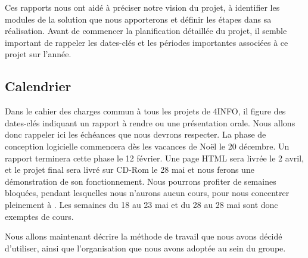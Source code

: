 	Ces rapports nous ont aidé à préciser notre vision du projet, à identifier les modules de la solution que nous apporterons et définir les étapes dans sa réalisation. Avant de commencer la planification détaillée du projet, il semble important de rappeler les dates-clés et les périodes importantes associées à ce projet sur l'année.

	\subsection{Calendrier}



	Dans le cahier des charges commun à tous les projets de 4INFO, il figure des dates-clés indiquant un rapport à rendre ou une présentation orale. Nous allons donc rappeler ici les échéances que nous devrons respecter. La phase de conception logicielle commencera dès les vacances de Noël le 20 décembre. Un rapport terminera cette phase le 12 février. Une page HTML sera livrée le 2 avril, et le projet final sera livré sur CD-Rom le 28 mai et nous ferons une démonstration de son fonctionnement.
	Nous pourrons profiter de semaines \og bloquées\fg{}, pendant lesquelles nous n'aurons aucun cours, pour nous concentrer pleinement à \glasir{}. Les semaines du 18 au 23 mai et du 28 au 28 mai sont donc exemptes de cours. 

	Nous allons maintenant décrire la méthode de travail que nous avons décidé d'utiliser, ainsi que l'organisation que nous avons adoptée au sein du groupe.
